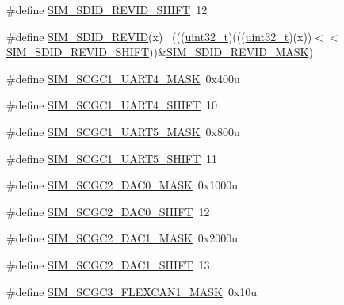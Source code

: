 \begin{DoxyCompactItemize}
\item 
\#define \hyperlink{group___s_i_m___register___masks_gadb535428e0ca83d2494493ed04822b8c}{S\+I\+M\+\_\+\+S\+D\+I\+D\+\_\+\+R\+E\+V\+I\+D\+\_\+\+S\+H\+I\+FT}~12
\item 
\#define \hyperlink{group___s_i_m___register___masks_ga892bb65b3dc043087208ead1ea269b95}{S\+I\+M\+\_\+\+S\+D\+I\+D\+\_\+\+R\+E\+V\+ID}(x)                                            ~(((\hyperlink{_p_e___types_8h_a33594304e786b158f3fb30289278f5af}{uint32\+\_\+t})(((\hyperlink{_p_e___types_8h_a33594304e786b158f3fb30289278f5af}{uint32\+\_\+t})(x))$<$$<$\hyperlink{group___s_i_m___register___masks_gadb535428e0ca83d2494493ed04822b8c}{S\+I\+M\+\_\+\+S\+D\+I\+D\+\_\+\+R\+E\+V\+I\+D\+\_\+\+S\+H\+I\+FT}))\&\hyperlink{group___s_i_m___register___masks_gafefd91d0385c1b93049ec14409ed6b1e}{S\+I\+M\+\_\+\+S\+D\+I\+D\+\_\+\+R\+E\+V\+I\+D\+\_\+\+M\+A\+SK})
\item 
\#define \hyperlink{group___s_i_m___register___masks_ga8f954b824205f507499799ba8262b366}{S\+I\+M\+\_\+\+S\+C\+G\+C1\+\_\+\+U\+A\+R\+T4\+\_\+\+M\+A\+SK}~0x400u
\item 
\#define \hyperlink{group___s_i_m___register___masks_ga0808f41650f2b3824b779bf4f2273f08}{S\+I\+M\+\_\+\+S\+C\+G\+C1\+\_\+\+U\+A\+R\+T4\+\_\+\+S\+H\+I\+FT}~10
\item 
\#define \hyperlink{group___s_i_m___register___masks_ga6d5168e1b4f532ad0d6e3836dd5560f3}{S\+I\+M\+\_\+\+S\+C\+G\+C1\+\_\+\+U\+A\+R\+T5\+\_\+\+M\+A\+SK}~0x800u
\item 
\#define \hyperlink{group___s_i_m___register___masks_ga7a43287402d14ab06bb187be3fe36769}{S\+I\+M\+\_\+\+S\+C\+G\+C1\+\_\+\+U\+A\+R\+T5\+\_\+\+S\+H\+I\+FT}~11
\item 
\#define \hyperlink{group___s_i_m___register___masks_gaa2ff8b125be9c2ba5100d9764d43ad90}{S\+I\+M\+\_\+\+S\+C\+G\+C2\+\_\+\+D\+A\+C0\+\_\+\+M\+A\+SK}~0x1000u
\item 
\#define \hyperlink{group___s_i_m___register___masks_gaae3b27d52cfc735e1bdb66bff969acec}{S\+I\+M\+\_\+\+S\+C\+G\+C2\+\_\+\+D\+A\+C0\+\_\+\+S\+H\+I\+FT}~12
\item 
\#define \hyperlink{group___s_i_m___register___masks_ga0eb5afe8f10a57c76d6a8d6dccadf171}{S\+I\+M\+\_\+\+S\+C\+G\+C2\+\_\+\+D\+A\+C1\+\_\+\+M\+A\+SK}~0x2000u
\item 
\#define \hyperlink{group___s_i_m___register___masks_ga3a5d82ec75bcae51f4904dc94148a675}{S\+I\+M\+\_\+\+S\+C\+G\+C2\+\_\+\+D\+A\+C1\+\_\+\+S\+H\+I\+FT}~13
\item 
\#define \hyperlink{group___s_i_m___register___masks_gad5ca1accf676cd89deb375ba851828cc}{S\+I\+M\+\_\+\+S\+C\+G\+C3\+\_\+\+F\+L\+E\+X\+C\+A\+N1\+\_\+\+M\+A\+SK}~0x10u
$$
\end{DoxyCompactItemize}
